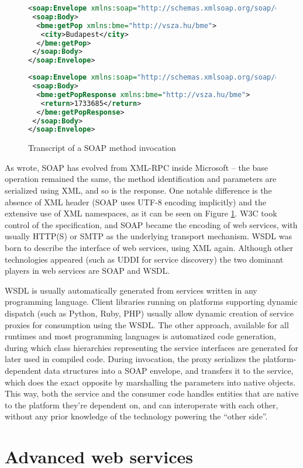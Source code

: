 \begin{figure}[htbp]
 \centering
 \begin{minipage}[t]{0.47\linewidth}
  \centering
  \begin{lstlisting}[language=XML, numbers=off]
<soap:Envelope xmlns:soap="http://schemas.xmlsoap.org/soap/envelope/">
 <soap:Body>
  <bme:getPop xmlns:bme="http://vsza.hu/bme">
   <city>Budapest</city>
  </bme:getPop>
 </soap:Body>
</soap:Envelope>
  \end{lstlisting}
 \end{minipage}
 \hspace{0.5cm}
 \begin{minipage}[t]{0.47\linewidth}
  \centering
  \begin{lstlisting}[language=XML, numbers=off]
<soap:Envelope xmlns:soap="http://schemas.xmlsoap.org/soap/envelope/">
 <soap:Body>
  <bme:getPopResponse xmlns:bme="http://vsza.hu/bme">
   <return>1733685</return>
  </bme:getPopResponse>
 </soap:Body>
</soap:Envelope>
  \end{lstlisting}
 \end{minipage}
 \caption{Transcript of a SOAP method invocation}
 \label{fig:soap-sample}
\end{figure}

As \cite{box_soap_history} wrote, SOAP has evolved from XML-RPC inside Microsoft -- the base operation remained the same, the method identification and parameters are serialized using XML, and so is the response. One notable difference is the absence of XML header (SOAP uses UTF-8 encoding implicitly) and the extensive use of XML namespaces, as it can be seen on Figure \ref{fig:soap-sample}. W3C took control of the specification, and SOAP became the encoding of web services, with usually HTTP(S) or SMTP as the underlying transport mechanism. WSDL was born to describe the interface of web services, using XML again. Although other technologies appeared (such as UDDI for service discovery) the two dominant players in web services are SOAP and WSDL.

WSDL is usually automatically generated from services written in any programming language. Client libraries running on platforms supporting dynamic dispatch (such as Python, Ruby, PHP) usually allow dynamic creation of service proxies for consumption using the WSDL. The other approach, available for all runtimes and most programming languages is automatized code generation, during which class hierarchies representing the service interfaces are generated for later used in compiled code. During invocation, the proxy serializes the platform-dependent data structures into a SOAP envelope, and transfers it to the service, which does the exact opposite by marshalling the parameters into native objects. This way, both the service and the consumer code handles entities that are native to the platform they're dependent on, and can interoperate with each other, without any prior knowledge of the technology powering the ``other side''.

\section{Advanced web services}

